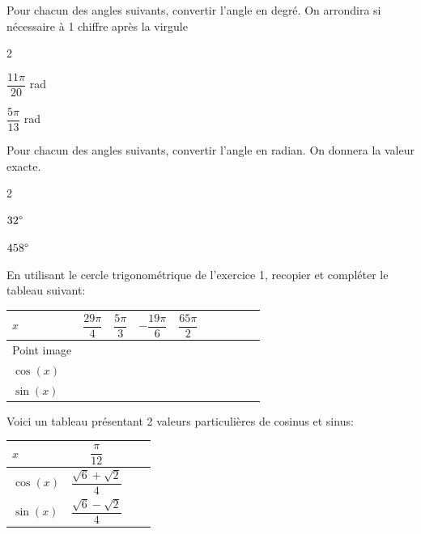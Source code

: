 \documentclass[11pt,a4paper]{article}  %
\begin{document}
Pour chacun des angles suivants, convertir l'angle en degré. On arrondira si nécessaire à 1 chiffre après la virgule
\begin{multicols}{2}
	\begin{enumMet}
		\item $\dfrac{11\pi}{20}$ rad
		\item $\dfrac{5\pi}{13}$ rad
	\end{enumMet}
\end{multicols}

Pour chacun des angles suivants, convertir l'angle en radian. On donnera la valeur exacte.
\begin{multicols}{2}
	\begin{enumMet}
		\item $32\degree$
		\item $458\degree$
	\end{enumMet}
\end{multicols}


En utilisant le cercle trigonométrique de l'exercice 1, recopier et compléter le tableau suivant:\\
\begin{center}
	\begin{tabular}{ | Xc | Xc | Xc | Xc | Xc | }
		\hline
		$x$  & $\dfrac{29\pi}{4}$ & $\dfrac{5\pi}{3}$ & $-\dfrac{19\pi}{6}$ &  $\dfrac{65\pi}{2}$ \rule[-12pt]{0pt}{33pt}\\ \hline
		Point image  &   &   &   &   \\ \hline
		$\cos(x)$  &   &   &   &   \\ \hline
		$\sin(x)$ &   &   &   &   \\
		\hline  
	\end{tabular}
\end{center}


Voici un tableau présentant 2 valeurs particulières de cosinus et sinus:\\
\begin{center}
	\begin{tabular}{ | Xc | Xc | }
		\hline
		$x$  & $\dfrac{\pi}{12}$ \rule[-12pt]{0pt}{33pt}\\ \hline
		$\cos(x)$  & $\dfrac{\sqrt{6}+\sqrt{2}}{4}$ \rule[-12pt]{0pt}{33pt}\\ \hline
		$\sin(x)$ & $\dfrac{\sqrt{6}-\sqrt{2}}{4}$  \rule[-12pt]{0pt}{33pt}\\
		\hline  
	\end{tabular}
\end{center}
\end{document}
